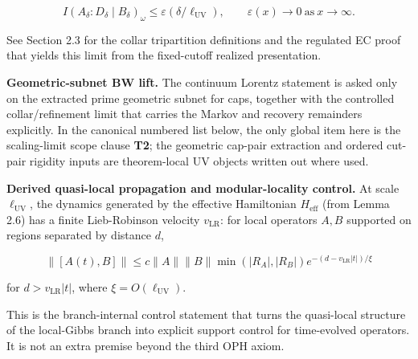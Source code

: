 \[
I(A_\delta:D_\delta \mid B_\delta)_\omega \le \varepsilon(\delta/\ell_{\mathrm{UV}}),
\qquad \varepsilon(x) \to 0 \ \text{as} \ x \to \infty.
\]

See Section 2.3 for the collar tripartition definitions and the regulated EC proof that yields this limit from the fixed-cutoff realized presentation.

\textbf{Geometric-subnet BW lift.} The continuum Lorentz statement is asked only on the extracted prime geometric subnet for caps, together with the controlled collar/refinement limit that carries the Markov and recovery remainders explicitly. In the canonical numbered list below, the only global item here is the scaling-limit scope clause \textbf{T2}; the geometric cap-pair extraction and ordered cut-pair rigidity inputs are theorem-local UV objects written out where used.

\textbf{Derived quasi-local propagation and modular-locality control.} At scale \(\ell_{\mathrm{UV}}\), the dynamics generated by the effective Hamiltonian \(H_{\mathrm{eff}}\) (from Lemma 2.6) has a finite Lieb-Robinson velocity \(v_{\mathrm{LR}}\): for local operators \(A, B\) supported on regions separated by distance \(d\),

\[
\|[A(t), B]\| \le c \|A\| \|B\| \min(|R_A|, |R_B|) e^{-(d - v_{\mathrm{LR}}|t|)/\xi}
\]

for \(d > v_{\mathrm{LR}}|t|\), where \(\xi = O(\ell_{\mathrm{UV}})\).

This is the branch-internal control statement that turns the quasi-local structure of the
local-Gibbs branch into explicit support control for time-evolved operators. It is not an extra
premise beyond the third OPH axiom.

